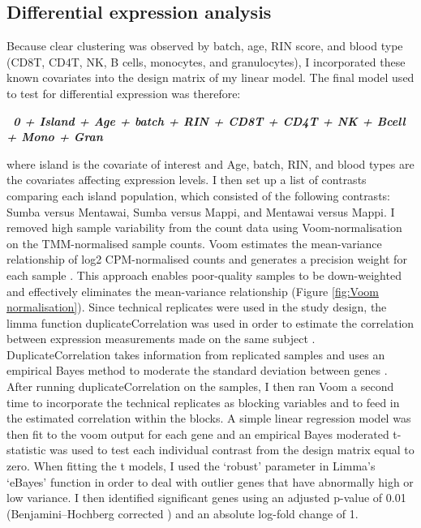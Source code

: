 \documentclass[12pt,a4paper,titlepage,twoside,openright]{book}
\begin{document}
\begin{mainmatter}
{{\section{Differential expression analysis}
Because clear clustering was observed by batch, age, RIN score, and blood type (CD8T, CD4T, NK, B cells, monocytes, and granulocytes), I incorporated these known covariates into the design matrix of my linear model. The final model used to test for differential expression was therefore:

\textbf{\textit{~0 + Island + Age + batch + RIN + CD8T + CD4T + NK + Bcell + Mono + Gran}}

where island is the covariate of interest and Age, batch, RIN, and blood types are the covariates affecting expression levels. I then set up a list of contrasts comparing each island population, which consisted of the following contrasts: Sumba versus Mentawai, Sumba versus Mappi, and Mentawai versus Mappi.  
I removed high sample variability from the count data using Voom-normalisation on the TMM-normalised sample counts. Voom estimates the mean-variance relationship of log2 CPM-normalised counts and generates a precision weight for each sample \cite{law2014voom}. This approach enables poor-quality samples to be down-weighted and effectively eliminates the mean-variance relationship (﻿Figure \ref{fig:Voom normalisation}). Since technical replicates were used in the study design, the limma function duplicateCorrelation was used in order to estimate the correlation between expression measurements made on the same subject \cite{smyth2003limma}. DuplicateCorrelation takes information from replicated samples and uses an empirical Bayes method to moderate the standard deviation between genes \cite{smyth2003limma}. After running duplicateCorrelation on the samples, I then ran Voom a second time to incorporate the technical replicates as blocking variables and to feed in the estimated correlation within the blocks. A simple linear regression model was then fit to the voom output for each gene and an empirical Bayes moderated t-statistic was used to test each individual contrast from the design matrix equal to zero. When fitting the t models, I used the ‘robust’ parameter in Limma’s ‘eBayes’ function in order to deal with outlier genes that have abnormally high or low variance. I then identified significant genes using an adjusted p-value of 0.01 (Benjamini–Hochberg corrected \cite{Pbenjamini1995controlling}) and an absolute log-fold change of 1. 

}}
\end{mainmatter}
\end{document}
